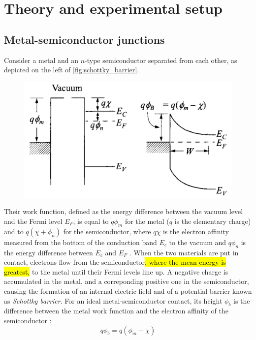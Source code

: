 \section{Theory and experimental setup}
\subsection{Metal-semiconductor junctions}
Consider a metal and an $n$-type semiconductor separated from each other, as depicted on the left of \autoref{fig:schottky_barrier}.
\begin{figure}[htbp]
    \centering
    \includegraphics[width=12cm]{figures/schottky_barrier.png}
    \caption{}
    \label{fig:schottky_barrier}
\end{figure}
Their work function, defined as the energy difference between the vacuum level and the Fermi level $E_F$, is equal to $q \phi_m$ for the metal ($q$ is the elementary charge) and to $q (\chi + \phi_n)$ for the semiconductor, where $q \chi$ is the electron affinity measured from the bottom of the conduction band $E_c$ to the vacuum and $q\phi_n$ is the energy difference between $E_c$ and $E_F$ \cite{sze_physics_2007}.
When the two materials are put in contact, electrons flow from the semiconductor\hl{, where the mean energy is greatest,} to the metal until their Fermi levels line up.
A negative charge is accumulated in the metal, and a correponding positive one in the semiconductor, causing the formation of an internal electric field and of a potential barrier known as \emph{Schottky barrier}.
For an ideal metal-semiconductor contact, its height $\phi_b$ is the difference between the metal work function and the electron affinity of the semiconductor \cite{sze_physics_2007}:
\begin{equation} \label{eq:barrier_height}
    q\phi_b = q(\phi_m - \chi)
\end{equation}

